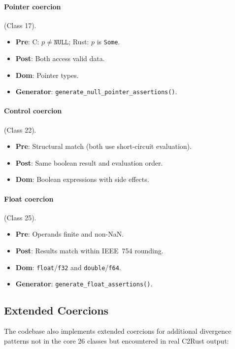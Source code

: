 \documentclass[10pt,a4paper]{article}
\begin{document}
\begin{appendices}
\paragraph{Pointer coercion} (Class 17).
\begin{itemize}[nosep]
  \item \textbf{Pre}: C: $p \neq \texttt{NULL}$; Rust: $p$ is \texttt{Some}.
  \item \textbf{Post}: Both access valid data.
  \item \textbf{Dom}: Pointer types.
  \item \textbf{Generator}: \texttt{generate\_null\_pointer\_assertions()}.
\end{itemize}

\paragraph{Control coercion} (Class 22).
\begin{itemize}[nosep]
  \item \textbf{Pre}: Structural match (both use short-circuit evaluation).
  \item \textbf{Post}: Same boolean result and evaluation order.
  \item \textbf{Dom}: Boolean expressions with side effects.
\end{itemize}

\paragraph{Float coercion} (Class 25).
\begin{itemize}[nosep]
  \item \textbf{Pre}: Operands finite and non-NaN.
  \item \textbf{Post}: Results match within IEEE~754 rounding.
  \item \textbf{Dom}: \texttt{float}/\texttt{f32} and
    \texttt{double}/\texttt{f64}.
  \item \textbf{Generator}: \texttt{generate\_float\_assertions()}.
\end{itemize}

\subsection{Extended Coercions}

The codebase also implements extended coercions for additional
divergence patterns not in the core 26 classes but encountered
in real C2Rust output:


\end{appendices}
\end{document}

